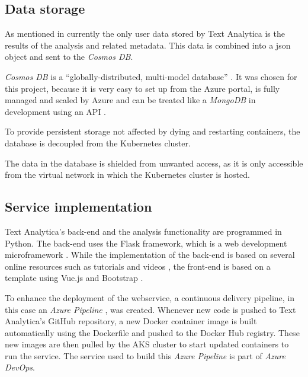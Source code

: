 \documentclass[conference]{IEEEtran}
\begin{document}
\subsection{Data storage}
As mentioned in  currently the only user data stored by Text Analytica is the results of the analysis and related metadata. This data is combined into a json object and sent to the \textit{Cosmos DB}.

\textit{Cosmos DB} is a “globally-distributed, multi-model database” \cite{CosmosDB}. It was chosen for this project, because it is very easy to set up from the Azure portal, is fully managed and scaled by Azure and can be treated like a \textit{MongoDB} in development using an API \cite{CosmosMongoDB}.

To provide persistent storage not affected by dying and restarting containers, the database is decoupled from the Kubernetes cluster.

The data in the database is shielded from unwanted access, as it is only accessible from the virtual network in which the Kubernetes cluster is hosted.

\subsection{Service implementation}
Text Analytica's back-end and the analysis functionality are programmed in Python. The back-end uses the Flask framework, which is a web development microframework \cite{Flask}. While the implementation of the back-end is based on several online resources such as tutorials and videos \cite{FlaskOnKubernetes, FlaskVue, FlaskMongo}, the front-end is based on a template using Vue.js and Bootstrap \cite{Bootstrap}.

To enhance the deployment of the webservice, a continuous delivery pipeline, in this case an \textit{Azure Pipeline} \cite{AzurePipeline}, was created. Whenever new code is pushed to Text Analytica's GitHub repository, a new Docker container image is built automatically using the Dockerfile and pushed to the Docker Hub registry. These new images are then pulled by the AKS cluster to start updated containers to run the service. The service used to build this \textit{Azure Pipeline} is part of \textit{Azure DevOps}.
\end{document}
